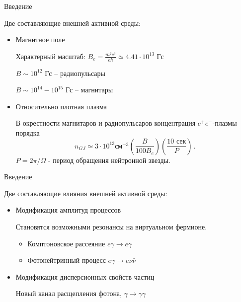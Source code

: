 \documentclass{beamer}
\begin{document}
\begin{frame}{Введение}

\begin{center}
Две составляющие внешней активной среды:
\end{center}
\begin{itemize}
\item Магнитное поле

Характерный масштаб: $B_e = \frac{m^2 c^3}{e\hbar} \simeq 4.41\cdot 10^{13}$ Гс

$B\sim 10^{12}$ Гс -- радиопульсары

$B\sim 10^{14}-10^{15}$ Гс -- магнитары

\item Относительно плотная плазма

В окрестности магнитаров и радиопульсаров концентрация $e^{+} e^{-}$-плазмы
порядка
$$n_{GJ} \simeq 3\cdot 10^{13} \text{см}^{-3} \left (\frac{B}{100 B_e} \right ) \left (\frac{10 \text{ сек}}{P} \right )\, .$$
$P=2\pi/\Omega$ - период обращения нейтронной звезды.


\end{itemize}
\end{frame}
\begin{frame}{Введение}
\begin{center}
Две составляющие влияния внешней активной среды:
\end{center}
\begin{itemize}
\item \alert{Модификация амплитуд процессов}

Становятся возможными резонансы на виртуальном фермионе.

\begin{itemize}
\item Комптоновское рассеяние $e\gamma\to e \gamma$

\item Фотонейтринный процесс $e\gamma\to e\nu\bar\nu$ 
\end{itemize}
\item \alert{Модификация дисперсионных свойств частиц}

Новый канал расщепления фотона, $\gamma\to\gamma\gamma$
\end{itemize}
\end{frame}
\end{document}
